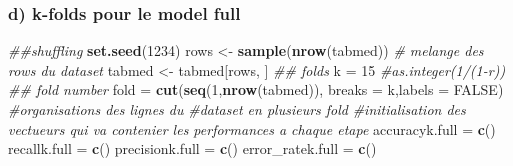 \documentclass[
]{article}
\newenvironment{Shaded}{\begin{snugshade}}{\end{snugshade}}
\newcommand{\CommentTok}[1]{\textcolor[rgb]{0.56,0.35,0.01}{\textit{#1}}}
\newcommand{\DataTypeTok}[1]{\textcolor[rgb]{0.13,0.29,0.53}{#1}}
\newcommand{\DecValTok}[1]{\textcolor[rgb]{0.00,0.00,0.81}{#1}}
\newcommand{\KeywordTok}[1]{\textcolor[rgb]{0.13,0.29,0.53}{\textbf{#1}}}
\newcommand{\NormalTok}[1]{#1}
\newcommand{\OtherTok}[1]{\textcolor[rgb]{0.56,0.35,0.01}{#1}}
\newcommand{\StringTok}[1]{\textcolor[rgb]{0.31,0.60,0.02}{#1}}
\begin{document}
\hypertarget{d-k-folds-pour-le-model-full}{%
\subsubsection{d) k-folds pour le model
full}\label{d-k-folds-pour-le-model-full}}

\begin{Shaded}
\begin{Highlighting}[]
\CommentTok{##shuffling}
\KeywordTok{set.seed}\NormalTok{(}\DecValTok{1234}\NormalTok{)}
\NormalTok{rows <-}\StringTok{ }\KeywordTok{sample}\NormalTok{(}\KeywordTok{nrow}\NormalTok{(tabmed)) }\CommentTok{# melange des rows du dataset}
\NormalTok{tabmed <-}\StringTok{ }\NormalTok{tabmed[rows, ]}
\CommentTok{## folds}
\NormalTok{k =}\StringTok{ }\DecValTok{15} \CommentTok{#as.integer(1/(1-r)) ## fold number}
\NormalTok{fold =}\StringTok{ }\KeywordTok{cut}\NormalTok{(}\KeywordTok{seq}\NormalTok{(}\DecValTok{1}\NormalTok{,}\KeywordTok{nrow}\NormalTok{(tabmed)), }\DataTypeTok{breaks =}\NormalTok{ k,}\DataTypeTok{labels =} \OtherTok{FALSE}\NormalTok{) }\CommentTok{#organisations des lignes du}
\CommentTok{#dataset en plusieurs fold}
\CommentTok{#initialisation des vectueurs qui va contenier les performances a chaque etape}
\NormalTok{accuracyk.full =}\StringTok{ }\KeywordTok{c}\NormalTok{()}
\NormalTok{recallk.full =}\StringTok{ }\KeywordTok{c}\NormalTok{()}
\NormalTok{precisionk.full =}\StringTok{ }\KeywordTok{c}\NormalTok{()}
\NormalTok{error_ratek.full =}\StringTok{ }\KeywordTok{c}\NormalTok{()}


\end{Highlighting}
\end{Shaded}
\end{document}

